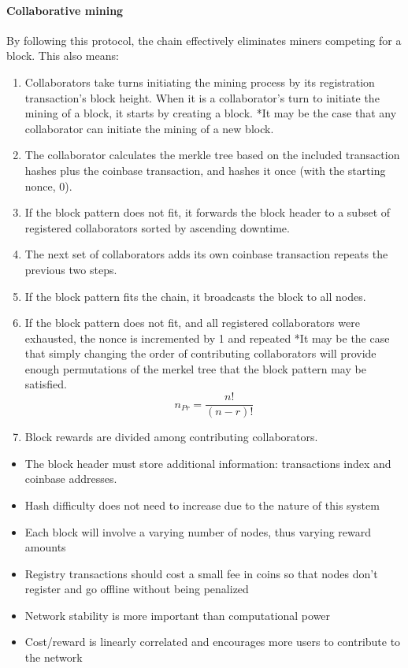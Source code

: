 \documentclass[10pt,twocolumn]{article}
\begin{document}
\paragraph{Collaborative mining}
By following this protocol, the chain effectively eliminates miners competing for a block.  This also means:
\begin{enumerate}[noitemsep]
\item Collaborators take turns initiating the mining process by its registration transaction's block height.  When it is a collaborator's turn to initiate the mining of a block, it starts by creating a block. *It may be the case that any collaborator can initiate the mining of a new block.
\item The collaborator calculates the merkle tree based on the included transaction hashes plus the coinbase transaction, and hashes it once (with the starting nonce, 0).
\item If the block pattern does not fit, it forwards the block header to a subset of registered collaborators sorted by ascending downtime. 
\item The next set of collaborators adds its own coinbase transaction repeats the previous two steps.
\item If the block pattern fits the chain, it broadcasts the block to all nodes.
\item If the block pattern does not fit, and all registered collaborators were exhausted, the nonce is incremented by 1 and repeated *It may be the case that simply changing the order of contributing collaborators will provide enough permutations of the merkel tree that the block pattern may be satisfied.
\[{n}_{Pr} = \frac{n!}{(n-r)!}\]
\item Block rewards are divided among contributing collaborators.
\end{enumerate}
\begin{itemize}[noitemsep]
\item The block header must store additional information: transactions index and coinbase addresses. 
\item Hash difficulty does not need to increase due to the nature of this system
\item Each block will involve a varying number of nodes, thus varying reward amounts
\item Registry transactions should cost a small fee in coins so that nodes don’t register and go offline without being penalized
\item Network stability is more important than computational power
\item Cost/reward is linearly correlated and encourages more users to contribute to the network
\end{itemize}
\end{document}
